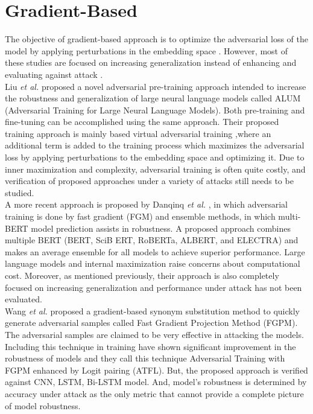 \documentclass[%
	BCOR=8mm, %
	DIV=12,
	toc=bibliography, %
	toc=listof, %
	oneside, %
	egregdoesnotlikesansseriftitles, %
	]{scrbook}
\begin{document}
\section{Gradient-Based }
\label{section:GradBasedAdvTra}
The objective of gradient-based approach is to optimize the adversarial loss of the model by applying perturbations in the embedding space \cite{liu_adversarial_2020,goodfellow_explaining_2015,zhu_at-bert_2021,miyato_adversarial_2017,jiang_smart_2020-1}.  However, most of these studies are focused on increasing generalization instead of enhancing and evaluating against attack .\\
 Liu \textit{et al.} \cite{liu_adversarial_2020} proposed a novel adversarial pre-training approach intended to increase the robustness and generalization of large neural language models called ALUM (Adversarial Training for Large Neural Language Models). Both pre-training and fine-tuning can be accomplished using the same approach. Their proposed training approach is mainly based virtual adversarial training \cite{miyato_virtual_2018},where an additional term is added to the training process which maximizes the adversarial loss by applying perturbations to the embedding space and optimizing it. Due to inner maximization and complexity, adversarial training is often quite costly, and verification of proposed approaches under a variety of attacks still needs to be studied.\\
A more recent approach is proposed by Danqinq \textit{et al.} \cite{zhu_at-bert_2021}, in which adversarial training is done by fast gradient (FGM) \cite{miyato_adversarial_2017} and ensemble methods, in which multi-BERT model prediction assists in robustness. A proposed approach combines multiple BERT (BERT, SciB ERT, RoBERTa, ALBERT, and ELECTRA) and makes an average ensemble for all models to achieve superior performance. Large language models and internal maximization raise concerns about computational cost. Moreover, as mentioned previously, their approach is also completely focused on increasing generalization and performance under attack has not been evaluated.\\
Wang \textit{et al.} \cite{wang_adversarial_2021-1} proposed a gradient-based synonym substitution method to quickly generate adversarial samples called Fast Gradient Projection Method (FGPM). The adversarial samples are claimed to be very effective in attacking the models. Including this technique in training have shown significant improvement in the robustness of models and they call this technique Adversarial Training with FGPM enhanced by Logit pairing (ATFL). But, the proposed approach is verified against CNN, LSTM, Bi-LSTM model. And, model's robustness is determined by accuracy under attack as the only metric that cannot provide a complete picture of model robustness.
\end{document}
